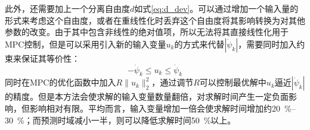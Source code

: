             此外，还需要加上一个分离自由度$d$如式\eqref{eq:d_dev}。可以通过增加一个输入量的形式来考虑这个自由度，或者在重线性化时丢弃这个自由度将其影响转换为对其他参数的改变。由于其中包含非线性的绝对值项，所以无法将其直接线性化用于MPC控制，但是可以采用引入新的输入变量$u_k$的方式来代替$|\dot{\psi}_k|$，需要同时加入约束来保证其等价性：
            \begin{equation}
             -\dot{\psi}_k \leq u_k \leq \dot{\psi}_k
            \end{equation}
            同时在MPC的优化函数中加入$R\|u_k\|_2^2$，通过调节$R$可以控制最优解中$u_k$逼近$|\dot{\psi}_k|$的精度。但是本方法会使求解的输入变量数量翻倍，对求解时间产生一定负面影响，但影响相对有限。平均而言，输入变量增加一倍会使求解时间增加约\SIrange{20}{30}{\percent}；而预测时域减小一半，则可以降低求解时间\SI{50}{\percent}以上。

